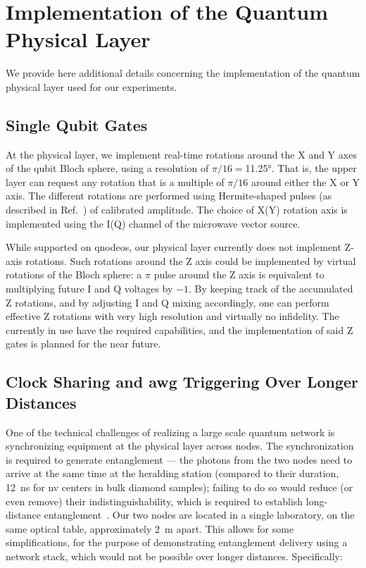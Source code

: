 \chapter{Implementation of the Quantum Physical Layer}
\label{app:phys}

We provide here additional details concerning the implementation of the quantum physical layer used
for our experiments.

\section{Single Qubit Gates}
\label{sec:app:phys:sqg}

At the physical layer, we implement real-time rotations around the X and Y axes of the qubit Bloch
sphere, using a resolution of $\pi/16=$\ang{11.25}. That is, the upper layer can request any
rotation that is a multiple of $\pi/16$ around either the X or Y axis. The different rotations are
performed using Hermite-shaped pulses (as described in Ref.~\cite{pompili_2021_multinode}) of
calibrated amplitude. The choice of X(Y) rotation axis is implemented using the I(Q) channel of the
microwave vector source.

While supported on \acrshort{qnodeos}, our physical layer currently does not implement Z-axis
rotations. Such rotations around the Z axis could be implemented by virtual rotations of the Bloch
sphere: a $\pi$ pulse around the Z axis is equivalent to multiplying future I and Q voltages by
$-1$. By keeping track of the accumulated Z rotations, and by adjusting I and Q mixing accordingly,
one can perform effective Z rotations with very high resolution and virtually no infidelity. The
 currently in use have the required capabilities, and the implementation of said Z
gates is planned for the near future.

\section{Clock Sharing and \acrshort{awg} Triggering Over Longer Distances}
\label{sec:app:phys:longdist}

One of the technical challenges of realizing a large scale quantum network is synchronizing
equipment at the physical layer across nodes. The synchronization is required to generate
entanglement --- the photons from the two nodes need to arrive at the same time at the heralding
station (compared to their duration, \qty{12}{\ns} for \acrshort{nv} centers in bulk diamond
samples); failing to do so would reduce (or even remove) their indistinguishability, which is
required to establish long-distance entanglement~\cite{pompili_2021_multinode}. Our two nodes are
located in a single laboratory, on the same optical table, approximately \qty{2}{\m} apart. This
allows for some simplifications, for the purpose of demonstrating entanglement delivery using a
network stack, which would not be possible over longer distances. Specifically:

